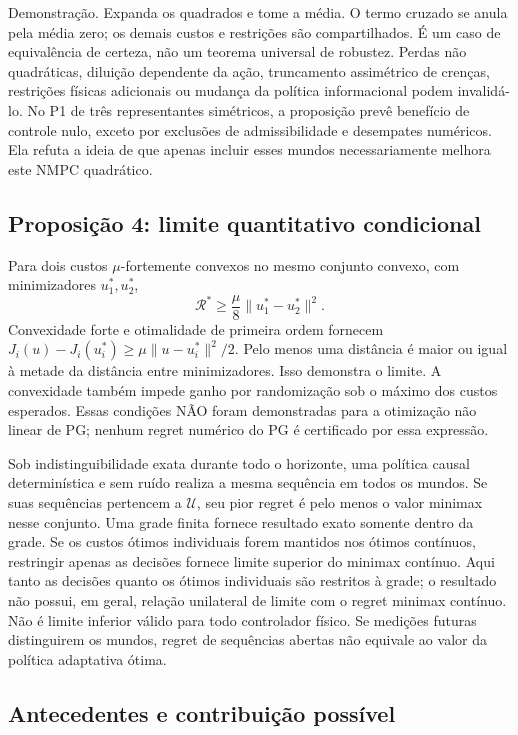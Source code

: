 \documentclass[
  11pt,
]{article}
\begin{document}
Demonstração. Expanda os quadrados e tome a média. O termo cruzado se
anula pela média zero; os demais custos e restrições são compartilhados.
É um caso de equivalência de certeza, não um teorema universal de
robustez. Perdas não quadráticas, diluição dependente da ação,
truncamento assimétrico de crenças, restrições físicas adicionais ou
mudança da política informacional podem invalidá-lo. No P1 de três
representantes simétricos, a proposição prevê benefício de controle
nulo, exceto por exclusões de admissibilidade e desempates numéricos.
Ela refuta a ideia de que apenas incluir esses mundos necessariamente
melhora este NMPC quadrático.

\hypertarget{proposiuxe7uxe3o-4-limite-quantitativo-condicional}{%
\subsection{Proposição 4: limite quantitativo
condicional}\label{proposiuxe7uxe3o-4-limite-quantitativo-condicional}}

Para dois custos \(\mu\)-fortemente convexos no mesmo conjunto convexo,
com minimizadores \(u_1^*,u_2^*\),
\[\mathcal R^*\geq\frac{\mu}{8}\|u_1^*-u_2^*\|^2.\] Convexidade forte e
otimalidade de primeira ordem fornecem
\(J_i(u)-J_i(u_i^*)\geq\mu\|u-u_i^*\|^2/2\). Pelo menos uma distância é
maior ou igual à metade da distância entre minimizadores. Isso demonstra
o limite. A convexidade também impede ganho por randomização sob o
máximo dos custos esperados. Essas condições NÃO foram demonstradas para
a otimização não linear de PG; nenhum regret numérico do PG é
certificado por essa expressão.

Sob indistinguibilidade exata durante todo o horizonte, uma política
causal determinística e sem ruído realiza a mesma sequência em todos os
mundos. Se suas sequências pertencem a \(\mathcal U\), seu pior regret é
pelo menos o valor minimax nesse conjunto. Uma grade finita fornece
resultado exato somente dentro da grade. Se os custos ótimos individuais
forem mantidos nos ótimos contínuos, restringir apenas as decisões
fornece limite superior do minimax contínuo. Aqui tanto as decisões
quanto os ótimos individuais são restritos à grade; o resultado não
possui, em geral, relação unilateral de limite com o regret minimax
contínuo. Não é limite inferior válido para todo controlador físico. Se
medições futuras distinguirem os mundos, regret de sequências abertas
não equivale ao valor da política adaptativa ótima.

\hypertarget{antecedentes-e-contribuiuxe7uxe3o-possuxedvel}{%
\subsection{Antecedentes e contribuição
possível}\label{antecedentes-e-contribuiuxe7uxe3o-possuxedvel}}
\end{document}

